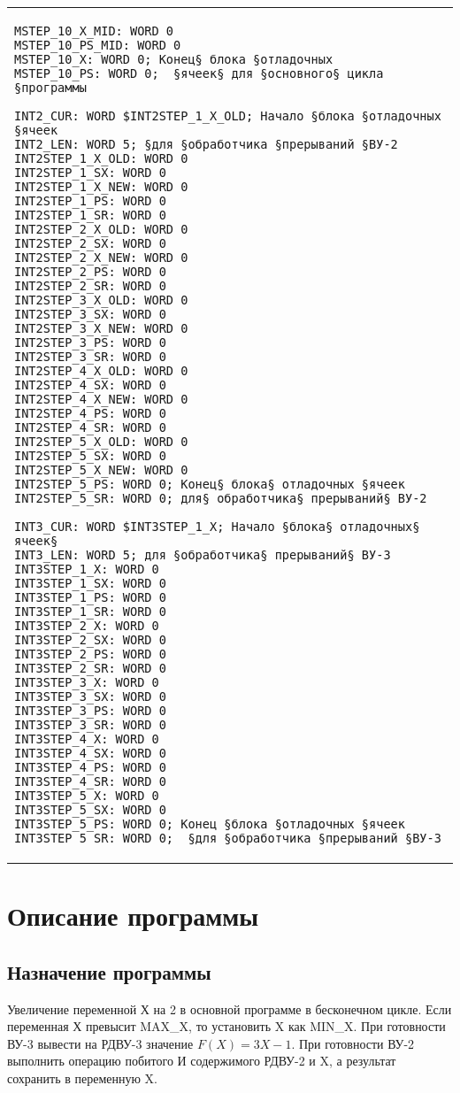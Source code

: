 \newpage
\noindent\begin{center}
	\begin{tabular}{l}
		\begin{lstlisting}[basicstyle=\ttfamily]
MSTEP_10_X_MID: WORD 0
MSTEP_10_PS_MID: WORD 0
MSTEP_10_X: WORD 0; Конец§ блока §отладочных
MSTEP_10_PS: WORD 0;  §ячеек§ для §основного§ цикла §программы 

INT2_CUR: WORD $INT2STEP_1_X_OLD; Начало §блока §отладочных §ячеек 
INT2_LEN: WORD 5; §для §обработчика §прерываний §ВУ-2
INT2STEP_1_X_OLD: WORD 0
INT2STEP_1_SX: WORD 0
INT2STEP_1_X_NEW: WORD 0
INT2STEP_1_PS: WORD 0
INT2STEP_1_SR: WORD 0
INT2STEP_2_X_OLD: WORD 0
INT2STEP_2_SX: WORD 0
INT2STEP_2_X_NEW: WORD 0
INT2STEP_2_PS: WORD 0
INT2STEP_2_SR: WORD 0
INT2STEP_3_X_OLD: WORD 0
INT2STEP_3_SX: WORD 0
INT2STEP_3_X_NEW: WORD 0
INT2STEP_3_PS: WORD 0
INT2STEP_3_SR: WORD 0
INT2STEP_4_X_OLD: WORD 0
INT2STEP_4_SX: WORD 0
INT2STEP_4_X_NEW: WORD 0
INT2STEP_4_PS: WORD 0
INT2STEP_4_SR: WORD 0
INT2STEP_5_X_OLD: WORD 0
INT2STEP_5_SX: WORD 0
INT2STEP_5_X_NEW: WORD 0
INT2STEP_5_PS: WORD 0; Конец§ блока§ отладочных §ячеек
INT2STEP_5_SR: WORD 0; для§ обработчика§ прерываний§ ВУ-2

INT3_CUR: WORD $INT3STEP_1_X; Начало §блока§ отладочных§ ячеек§ 
INT3_LEN: WORD 5; для §обработчика§ прерываний§ ВУ-3
INT3STEP_1_X: WORD 0
INT3STEP_1_SX: WORD 0
INT3STEP_1_PS: WORD 0
INT3STEP_1_SR: WORD 0
INT3STEP_2_X: WORD 0
INT3STEP_2_SX: WORD 0
INT3STEP_2_PS: WORD 0
INT3STEP_2_SR: WORD 0
INT3STEP_3_X: WORD 0
INT3STEP_3_SX: WORD 0
INT3STEP_3_PS: WORD 0
INT3STEP_3_SR: WORD 0
INT3STEP_4_X: WORD 0
INT3STEP_4_SX: WORD 0
INT3STEP_4_PS: WORD 0
INT3STEP_4_SR: WORD 0
INT3STEP_5_X: WORD 0
INT3STEP_5_SX: WORD 0
INT3STEP_5_PS: WORD 0; Конец §блока §отладочных §ячеек
INT3STEP_5_SR: WORD 0;  §для §обработчика §прерываний §ВУ-3
		\end{lstlisting}
	\end{tabular}
\end{center}
\newpage

\section{Описание программы}
\subsection{Назначение программы}
Увеличение переменной Х на 2 в основной программе в бесконечном цикле. Если переменная Х превысит MAX\_X, то установить X как MIN\_X. При готовности ВУ-3 вывести на РДВУ-3 значение $ F(X) = 3X - 1 $. При готовности ВУ-2 выполнить операцию побитого И содержимого РДВУ-2 и X, а результат сохранить в переменную X.

